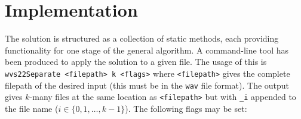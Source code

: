 \documentclass[12pt,a4paper,twoside,openright]{report}
\begin{document}


\chapter{Implementation}

The solution is structured as a collection of static methods, each providing functionality for one stage of the general algorithm. A command-line tool has been produced to apply the solution to a given file. The usage of this is \texttt{wvs22Separate <filepath> k <flags>} where \texttt{<filepath>} gives the complete filepath of the desired input (this must be in the \texttt{wav} file format). The output gives $ k $-many files at the same location as \texttt{<filepath>} but with \texttt{\_i} appended to the file name ($ i \in \{0, 1, \ldots, k-1\} $). The following flags may be set:

\bigskip

\end{document}
